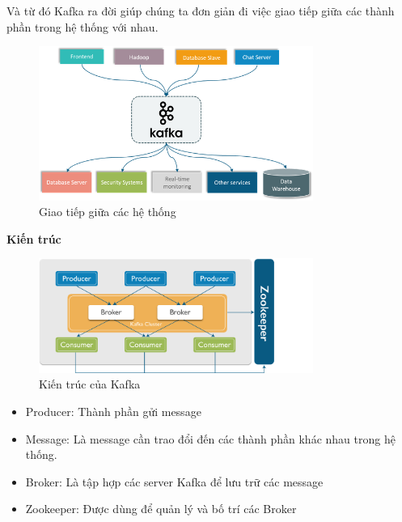             Và từ đó Kafka ra đời giúp chúng ta đơn giản đi việc giao tiếp giữa các thành phần trong hệ thống với nhau.
            
             \begin{figure}[H]   			\includegraphics[width=0.8\textwidth]{Images/Kafka3.png}
    		\centering
    		\linebreak
    		\caption{Giao tiếp giữa các hệ thống}
            \end{figure}
            
            \textbf{Kiến trúc}
            
             \begin{figure}[H]   			\includegraphics[width=0.8\textwidth]{Images/Kafka2.png}
    		\centering
    		\linebreak
    		\caption{Kiến trúc của Kafka}
            \end{figure}
            
            \begin{itemize}
                \item Producer: Thành phần gửi message
                \item Message: Là message cần trao đổi đến các thành phần khác nhau trong hệ thống.
                \item Broker: Là tập hợp các server Kafka để lưu trữ các message
                \item Zookeeper: Được dùng để quản lý và bố trí các Broker
            \end{itemize}
            
